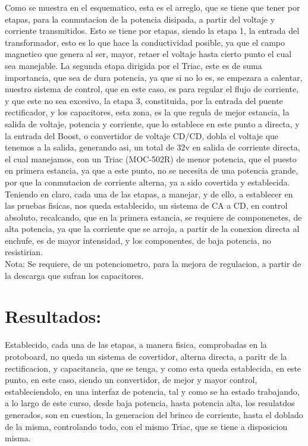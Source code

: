 \documentclass[12pt,a4paper]{article}
\begin{document}
Como se muestra en el esquematico, esta es el arreglo, que se tiene que tener por etapas, para la conmutacion de la potencia disipada, a partir del voltaje y corriente transmitidos. Esto se tiene por etapas, siendo la etapa 1, la entrada del transformador, esto es lo que hace la conductividad posible, ya que el campo magnetico 	que genera al ser, mayor, retaer el voltaje hasta cierto punto el cual sea manejable. La segunda etapa dirigida por el Triac, este es de suma importancia, que sea de dura potencia, ya que si no lo es, se empezara a calentar, nuestro sistema de control, que en este caso, es para regular el flujo de corriente, y que este no sea excesivo, la etapa 3, constituida, por la entrada del puente rectificador, y los capacitores, esta zona, es la que regula de mejor estancia, la salida de voltaje, potencia y corriente, que lo establece en este punto a directa, y la entrada del Boost, o convertidor de voltaje CD/CD, dobla el voltaje que tenemos a la salida, generando asi, un total de 32v en salida de corriente directa, el cual manejamos, con un Triac (MOC-502R) de menor potencia, que el puesto en primera estancia, ya que a este punto, no se necesita de una potencia grande, por que la conmutacion de corriente alterna, ya a sido covertida y establecida.\\

Teniendo en claro, cada una de las etapas, a manejar, y de ello, a establecer en las pruebas fisicas, nos queda establecido, un sistema de CA a CD, en control absoluto, recalcando, que en la primera estancia, se requiere de componenetes, de alta potencia, ya que la corriente que se arroja, a partir de la conexion directa al enchufe, es de mayor intensidad, y los componentes, de baja potencia, no resistirian.\\

Nota: Se requiere, de un potenciometro, para la mejora de regulacion, a partir de la descarga que sufran los capacitores.

\section{Resultados:}

Establecido, cada una de las etapas, a manera fisica, comprobadas en la protoboard, no queda un sistema de covertidor, alterna directa, a paritr de la rectificacion, y capacitancia, que se tenga, y como esta queda establecida, en este punto, en este caso, siendo un convertidor, de mejor y mayor control, estableciendolo, en una interfaz de potencia, tal y como se ha estado trabajando, a lo largo de este curso, desde baja potencia, hasta potencia alta, los resulatdos generados, son en cuestion, la generacion del brinco de corriente, hasta el doblado de la misma, controlando todo, con el mismo Triac, que se tiene a disposicion misma.\\
\end{document}
